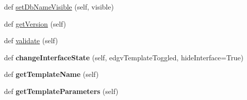 \begin{DoxyCompactItemize}
\item 
def \mbox{\hyperlink{class_dsg_tools_1_1_custom_widgets_1_1database_parameter_widget_1_1_database_parameter_widget_a2e910e5b16633b4514a8f109bf6f96dc}{set\+Db\+Name\+Visible}} (self, visible)
\item 
def \mbox{\hyperlink{class_dsg_tools_1_1_custom_widgets_1_1database_parameter_widget_1_1_database_parameter_widget_a6b2140843cf95447e00f5a3d64c23806}{get\+Version}} (self)
\item 
def \mbox{\hyperlink{class_dsg_tools_1_1_custom_widgets_1_1database_parameter_widget_1_1_database_parameter_widget_aac8d6148a95054fe708592324974eb93}{validate}} (self)
\item 
\mbox{\label{class_dsg_tools_1_1_custom_widgets_1_1database_parameter_widget_1_1_database_parameter_widget_a6103ab9383ec41f97149162ab5c31f61}} 
def {\bfseries change\+Interface\+State} (self, edgv\+Template\+Toggled, hide\+Interface=True)
\item 
\mbox{\label{class_dsg_tools_1_1_custom_widgets_1_1database_parameter_widget_1_1_database_parameter_widget_ae01855efcf7e57fceb218fe0ec8d8822}} 
def {\bfseries get\+Template\+Name} (self)
\item 
\mbox{\label{class_dsg_tools_1_1_custom_widgets_1_1database_parameter_widget_1_1_database_parameter_widget_aa2413f7004b4fd1bd0191840c19e624c}} 
def {\bfseries get\+Template\+Parameters} (self)
\end{DoxyCompactItemize}
